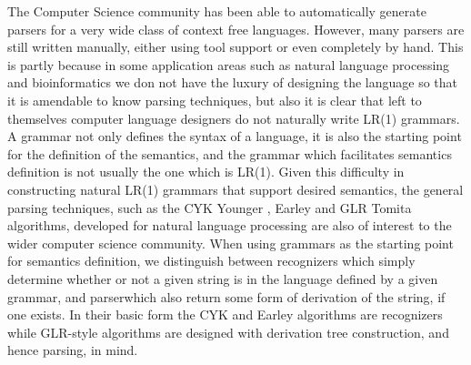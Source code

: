 \begin{isabellebody}
\begin{isamarkuptext}
The Computer Science community has been able to automatically generate parsers for a very wide class of context
free languages. However, many parsers are still written manually, either using tool support or even completely
by hand. This is partly because in some application areas such as natural language processing and bioinformatics
we don not have the luxury of designing the language so that it is amendable to know parsing techniques, but also
it is clear that left to themselves computer language designers do not naturally write LR(1) grammars. A grammar
not only defines the syntax of a language, it is also the starting point for the definition of the semantics,
and the grammar which facilitates semantics definition is not usually the one which is LR(1). Given this difficulty
in constructing natural LR(1) grammars that support desired semantics, the general parsing techniques, such as
the CYK Younger \cite{Younger:1967}, Earley \cite{Earley:1970} and GLR Tomita \cite{Tomita:1985} algorithms, developed
for natural language processing are also of interest to the wider computer science community. When using grammars as
the starting point for semantics definition, we distinguish between recognizers which simply determine whether or not
a given string is in the language defined by a given grammar, and parserwhich also return some form of derivation
of the string, if one exists. In their basic form the CYK and Earley algorithms are recognizers while GLR-style
algorithms are designed with derivation tree construction, and hence parsing, in mind.


\end{isamarkuptext}
\end{isabellebody}
